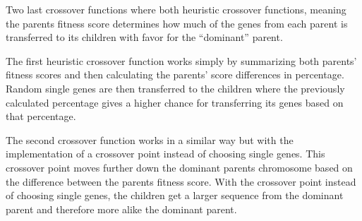 Two last crossover functions where both heuristic crossover functions, meaning the parents fitness score determines how much of the genes from each parent is transferred to its children with favor for the “dominant” parent.

\begin{par}
	The first heuristic crossover function works simply by summarizing both parents' fitness scores and then calculating the parents' score differences in percentage. Random single genes are then transferred to the children where the previously calculated percentage gives a higher chance for transferring its genes based on that percentage.
	\label{par:swap single genes}
\end{par}

\begin{par}
	The second crossover function works in a similar way but with the implementation of a crossover point instead of choosing single genes. This crossover point moves further down the dominant parents chromosome based on the difference between the parents fitness score. With the crossover point instead of choosing single genes, the children get a larger sequence from the dominant parent and therefore more alike the dominant parent.
	\label{par:swap sequnce of genes}
\end{par}